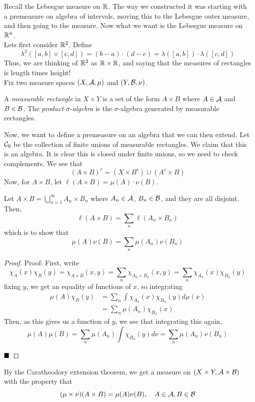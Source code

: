 Recall the Lebesgue measure on $\R$. The way we constructed it was starting with a premeasure on algebra of intervals, moving this to the Lebesgue outer measure, and then going to the measure. Now what we want is the Lebesgue measure on $\R^n$.\\

Lets first consider $\R^2$. Define
\[ \lambda^{2}([a, b] \times [c, d]) = (b - a) \cdot (d - c) = \lambda([a, b]) \cdot \lambda([c, d]) \]
Thus, we are thinking of $\R^2$ as $\R \times \R$, and saying that the measures of rectangles is length times height!\\

Fix two measure spaces $(X, \cal{A}, \mu)$ and $(Y, \cal{B}, \nu)$.
\begin{definition}
    A \emph{measurable rectangle} in $X \times Y$ is a set of the form $A \times B$ where $A \in \cal{A}$ and $B \in \cal{B}$. The \emph{product $\sigma$-algebra} is the $\sigma$-algebra generated by measurable rectangles. 
\end{definition}

Now, we want to define a premeasure on an algebra that we can then extend. Let $\cal{C}_{0}$ be the collection of finite unions of measurable rectangles. We claim that this is an algebra. It is clear this is closed under finite unions, so we need to check complements. We see that
\[ (A \times B)^{c} = (X \times B^{c}) \cup (A^{c} \times B) \]
Now, for $A \times B$, let $\ell(A \times B) = \mu(A) \cdot \nu(B)$. 

\begin{lemma}
    Let $A \times B = \bigcup_{n = 1}^{\infty} A_n \times B_n$ where $A_n \in \cal{A}$, $B_n \in \cal{B}$, and they are all disjoint. Then, 
    \[ \ell(A \times B) = \sum_{n} \ell(A_{n} \times B_{n}) \]
    which is to show that
    \[ \mu(A)\nu(B) = \sum_{n} \mu(A_n) \nu(B_n) \]
\end{lemma}
\begin{proof}{Proof:}
    First, write
    \[ \chi_{A}(x)\chi_{B}(y) = \chi_{A \times B}(x, y) = \sum_{n} \chi_{A_n \times B_{n}}(x, y) = \sum_{n} \chi_{A_n}(x)\chi_{B_n}(y) \]
    fixing $y$, we get an equality of functions of $x$, so integrating
    \begin{align*}
        \mu(A)\chi_{B}(y) &= \sum_{n} \int \chi_{A_n}(x)\chi_{B_n}(y)d\mu(x)\\
        &= \sum_{n} \mu(A_n)\chi_{B_n}(x)
    \end{align*}
    Then, as this gives us a function of $y$, we see that integrating this again, 
    \[ \mu(A)\mu(B) = \sum_{n} \mu(A_n) \int \chi_{B_n}(y)d\nu = \sum_{n} \mu(A_n)\nu(B_n) \]

    $\qed$
\end{proof}

By the Caratheodory extension theorem, we get a measure on $(X \times Y, \cal{A} \times \cal{B})$ with the property that
\[ (\mu \times \nu)(A \times B) = \mu(A) \nu(B),\quad A \in \cal{A}, B \in \cal{B} \]